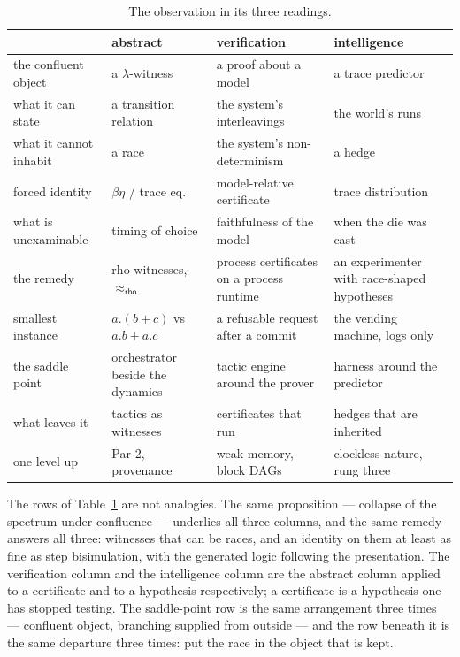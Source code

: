 \documentclass[11pt]{article}
\theoremstyle{plain}
\theoremstyle{definition}
\theoremstyle{remark}
\newcommand{\rhoc}{\textsf{rho}}
\newcommand{\bisW}[1]{\approx_{#1}}
\begin{document}
\begin{table}[h]
\centering
\small
\begin{tabular}{@{}p{}p{}p{}p{}@{}}
\toprule
 & \textbf{abstract} & \textbf{verification} & \textbf{intelligence} \\
\midrule
the confluent object & a $\lambda$-witness & a proof about a model & a trace predictor \\
what it can state & a transition relation & the system's interleavings & the world's runs \\
what it cannot inhabit & a race & the system's non-determinism & a hedge \\
forced identity & $\beta\eta$ / trace eq. & model-relative certificate & trace distribution \\
what is unexaminable & timing of choice & faithfulness of the model & when the die was cast \\
the remedy & rho witnesses, $\bisW{\rhoc}$ & process certificates on a process runtime & an experimenter with race-shaped hypotheses \\
smallest instance & $a.(b+c)$ vs $a.b+a.c$ & a refusable request after a commit & the vending machine, logs only \\
the saddle point & orchestrator beside the dynamics & tactic engine around the prover & harness around the predictor \\
what leaves it & tactics as witnesses & certificates that run & hedges that are inherited \\
one level up & Par-2, provenance & weak memory, block DAGs & clockless nature, rung three \\
\bottomrule
\end{tabular}
\caption{The observation in its three readings.}
\label{tab:three}
\end{table}

The rows of Table~\ref{tab:three} are not analogies. The same proposition ---
collapse of the spectrum under confluence --- underlies all three columns, and
the same remedy answers all three: witnesses that can be races, and an identity
on them at least as fine as step bisimulation, with the generated logic
following the presentation. The verification column and the intelligence
column are the abstract column applied to a certificate and to a hypothesis
respectively; a certificate is a hypothesis one has stopped testing. The
saddle-point row is the same arrangement three times --- confluent object,
branching supplied from outside --- and the row beneath it is the same
departure three times: put the race in the object that is kept.
\end{document}
